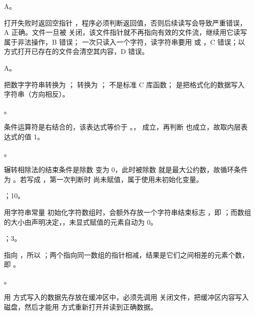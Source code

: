 \documentclass[a4paper,11pt]{article}
\begin{document}
\begin{qgroup}
\q A。
\begin{analysis}
 打开失败时返回空指针 ，程序必须判断返回值，否则后续读写会导致严重错误，A 正确。文件一旦被  关闭，该文件指针就不再指向有效的文件流，继续用它读写属于非法操作，B 错误； 一次只读入一个字符，读字符串要用  或 ，C 错误；以  方式打开已存在的文件会清空其内容，D 错误。
\end{analysis}

\q A。
\begin{analysis}
 把数字字符串转换为 ； 转换为 ； 不是标准 C 库函数； 是把格式化的数据写入字符串（方向相反）。
\end{analysis}
\end{qgroup}

\begin{qgroup}
。
\begin{analysis}
条件运算符是右结合的，该表达式等价于 。， 成立，再判断  也成立，故取内层表达式的值 1。
\end{analysis}

\q {}。
\begin{analysis}
辗转相除法的结束条件是除数  变为 0，此时被除数  就是最大公约数，故循环条件为 。若写成 ，第一次判断时  尚未赋值，属于使用未初始化变量。
\end{analysis}

\q {}；10。
\begin{analysis}
用字符串常量  初始化字符数组时，会额外存放一个字符串结束标志 ，即 ；而数组  的大小由声明决定，，未显式赋值的元素自动为 0。
\end{analysis}

；3。
\begin{analysis}
 指向 ，所以 ；两个指向同一数组的指针相减，结果是它们之间相差的元素个数，即 。
\end{analysis}

\q {}。
\begin{analysis}
用  方式写入的数据先存放在缓冲区中，必须先调用  关闭文件，把缓冲区内容写入磁盘，然后才能用  方式重新打开并读到正确数据。
\end{analysis}
\end{qgroup}
\end{document}
